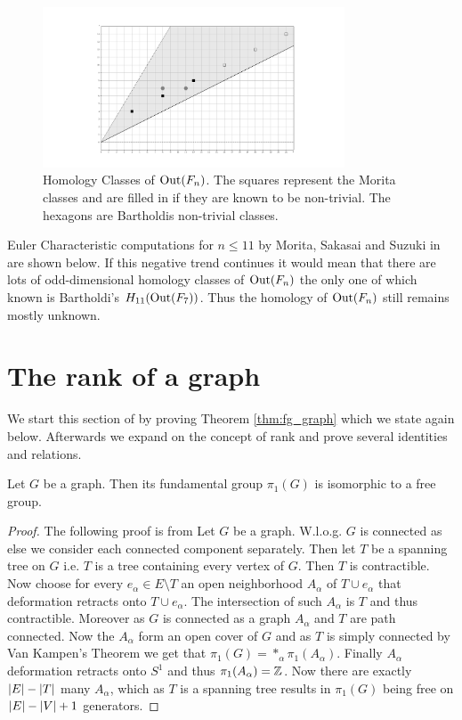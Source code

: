 \begin{figure}[h]
	\centering
	\captionsetup{width=0.8\textwidth}
	\includegraphics[width=0.8\textwidth]{./Images/OutFnHomology.png}
	\caption{Homology Classes of $\operatorname{Out}(F_{n})$. The squares represent the  Morita classes and are filled in if they are known to be non-trivial.
		The hexagons are Bartholdis non-trivial classes.}
\end{figure}

Euler Characteristic computations for $n \leq 11$ by Morita, Sakasai and Suzuki in \cite{morita15moduli,morita15euler} are shown below.
If this negative trend continues it would mean that there are lots of odd-dimensional
homology classes of $\operatorname{Out}(F_{n})$ the only one of which known is Bartholdi's $H_{11}(\operatorname{Out}(F_{7}))$.
Thus the homology of $\operatorname{Out}(F_{n})$ still remains mostly unknown.

\newpage


\section{The rank of a graph}\label{sec:RankGraph}
We start this section of by proving Theorem \ref{thm:fg_graph} which we state again below.
Afterwards we expand on the concept of rank and prove several identities and relations.

\begin{theorem}
	Let $G$ be a graph. Then its fundamental group $\pi_{1}(G)$ is isomorphic to a free group.
\end{theorem}

\begin{proof}
	The following proof is from \cite[p. 43f]{hatcher00}
	Let $G$ be a graph. W.l.o.g. $G$ is connected as else we consider each connected component separately. 
	Then let $T$ be a spanning tree on $G$ i.e. $T$ is a tree containing every vertex of $G$.
	Then $T$ is contractible.
	Now choose for every $e_{\alpha} \in E \setminus T$ an open neighborhood $A_{\alpha}$ of $T \cup e_{\alpha}$ that deformation retracts onto $T \cup e_{\alpha}$.
	The intersection of such $A_{\alpha}$ is $T$ and thus contractible. Moreover as $G$ is connected as a graph $A_{\alpha}$ and $T$ are path connected.
	Now the $A_{\alpha}$ form an open cover of $G$ and as $T$ is simply connected by Van Kampen's Theorem we get that $\pi_{1}(G) = *_{\alpha} \pi_{1}(A_{\alpha})$.
	Finally $A_{\alpha}$ deformation retracts onto $S^{1}$ and thus $\pi_{1}(A_{\alpha}) = \mathbb{Z}$. Now there are exactly $\abs{E} - \abs{T}$ many $A_{\alpha}$,
	which as $T$ is a spanning tree results in $\pi_1(G)$ being free on $\abs{E} - \abs{V} + 1$ generators.
\end{proof}

